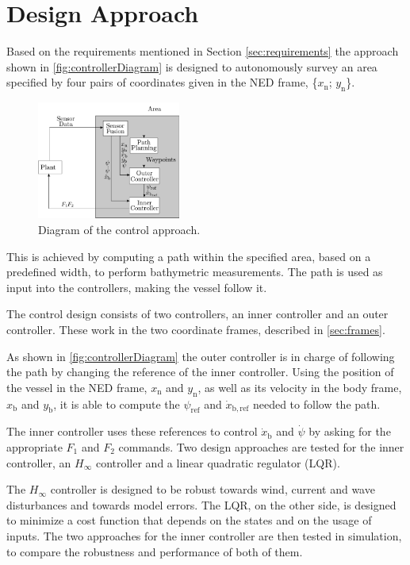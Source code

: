 \chapter{Design Approach} \label{chap:designaproach}
Based on the requirements mentioned in Section \ref{sec:requirements} the approach shown in \autoref{fig:controllerDiagram} is designed to autonomously survey an area specified by four pairs of coordinates given in the NED frame, \{$x_\mathrm{n}$; $y_\mathrm{n}$\}.
\begin{figure}[H]
    \includegraphics[width=0.42\textwidth]{figures/controllerDiagram2}
    \caption{Diagram of the control approach.}
    \label{fig:controllerDiagram}
\end{figure}

This is achieved by computing a path within the specified area, based on a predefined width, to perform bathymetric measurements. The path is used as input into the controllers, making the vessel follow it. 

The control design consists of two controllers, an inner controller and an outer controller. These work in the two coordinate frames, described in \autoref{sec:frames}.

As shown in \autoref{fig:controllerDiagram} the outer controller is in charge of following the path by changing the reference of the inner controller. Using the position of the vessel in the NED frame, $x_\mathrm{n}$ and $y_\mathrm{n}$, as well as its velocity in the body frame, $x_\mathrm{b}$ and $y_\mathrm{b}$, it is able to compute the $\psi_\mathrm{ref}$ and $\dot{x}_\mathrm{b,ref}$ needed to follow the path. 

The inner controller uses these references to control $\dot{x}_\mathrm{b}$ and $\dot{\psi}$ by asking for the appropriate $F_1$ and $F_2$ commands. Two design approaches are tested for the inner controller, an $H_{\infty}$ controller and a linear quadratic regulator (LQR).

The $H_{\infty}$ controller is designed to be robust towards wind, current and wave disturbances and towards model errors. The LQR, on the other side, is designed to minimize a cost function that depends on the states and on the usage of inputs. The two approaches for the inner controller are then tested in simulation, to compare the robustness and performance of both of them.

